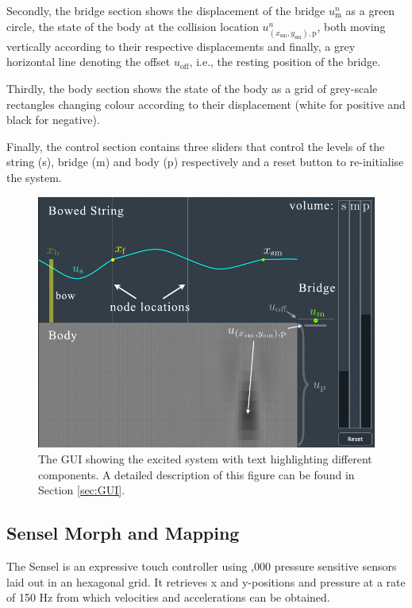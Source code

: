 \documentclass[dvipsnames, pdftex]{article}
\begin{document}
Secondly, the bridge section shows the displacement of the bridge $u_\text{m}^n$ as a green circle, the state of the body at the collision location $u_{(x_\text{sm},y_\text{sm}),\text{p}}^n$, both moving vertically according to their respective displacements and finally, a grey horizontal line denoting the offset $u_\text{off}$, i.e., the resting position of the bridge.

Thirdly, the body section shows the state of the body as a grid of grey-scale rectangles changing colour according to their displacement (white for positive and black for negative).

Finally, the control section contains three sliders that control the levels of the string (s), bridge (m) and body (p) respectively and a reset button to re-initialise the system. 
\begin{figure}[h]
  \centering
  \includegraphics[width=1.0\columnwidth]{applicationDescription.pdf}
  \caption{The GUI showing the excited system with text highlighting different components. A detailed description of this figure can be found in Section \ref{sec:GUI}.}
  \label{fig:GUI}
\end{figure}

\subsection{Sensel Morph and Mapping}
The Sensel is an expressive touch controller using ,000 pressure sensitive sensors laid out in an hexagonal grid\cite{sensel2020}. It retrieves x and y-positions and pressure at a rate of 150 Hz from which velocities and accelerations can be obtained.
\end{document}
